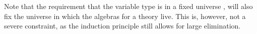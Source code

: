\documentclass{easychair}
\begin{document}
\begin{code}%
\>[0]\AgdaSpace{}%
\AgdaSpace{}%
\AgdaSymbol{(}\AgdaSpace{}%
\AgdaSpace{}%
\AgdaSymbol{)}\AgdaSpace{}%
\AgdaSymbol{:}\AgdaSpace{}%
\AgdaSymbol{(}\AgdaSpace{}%
\AgdaSpace{}%
\AgdaSpace{}%
\AgdaSpace{}%
\AgdaSymbol{)}\AgdaSpace{}%
\AgdaSpace{}%
\AgdaSpace{}%
\<%
\\
\>[2][@{}l@{\AgdaIndent{0}}]%
\>[4]%
\>[9]\AgdaSymbol{:}\AgdaSpace{}%
\AgdaSpace{}%
\AgdaSpace{}%
\<%
\\
%
\>[4]%
\>[9]\AgdaSymbol{:}\AgdaSpace{}%
\AgdaSpace{}%
\AgdaSymbol{\{}\AgdaSpace{}%
\AgdaSymbol{:}\AgdaSpace{}%
\AgdaSpace{}%
\AgdaSymbol{\}}\AgdaSpace{}%
\AgdaSpace{}%
\AgdaSpace{}%
\AgdaSymbol{(}\AgdaSpace{}%
\AgdaSpace{}%
\AgdaSymbol{)}\AgdaSpace{}%
\<%
\end{code}
Note that the requirement that the variable type  is in a fixed
universe , will also fix the universe in which the algebras for
a theory live.
This is, however, not a severe constraint, as the induction principle still
allows for large elimination.
\end{document}
